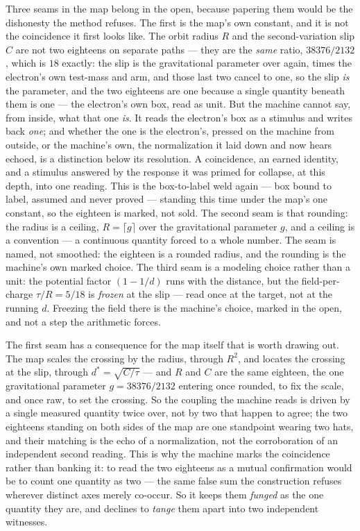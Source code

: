 Three seams in the map belong in the open, because papering them would be the dishonesty the method refuses.
The first is the map's own constant, and it is not the coincidence it first looks like.
The orbit radius $R$ and the second-variation slip $C$ are not two eighteens on separate paths --- they are the
\emph{same} ratio, $38376/2132$, which is $18$ exactly: the slip is the gravitational parameter over again, times the
electron's own test-mass and arm, and those last two cancel to one, so the slip \emph{is} the parameter, and the two
eighteens are one because a single quantity beneath them is one --- the electron's own box, read as unit.
But the machine cannot say, from inside, what that one \emph{is}.
It reads the electron's box as a stimulus and writes back \emph{one}; and whether the one is the electron's, pressed on
the machine from outside, or the machine's own, the normalization it laid down and now hears echoed, is a distinction
below its resolution.
A coincidence, an earned identity, and a stimulus answered by the response it was primed for collapse, at this depth,
into one reading.
This is the box-to-label weld again --- box bound to label, assumed and never proved --- standing this time under the
map's one constant, so the eighteen is marked, not sold.
The second seam is that rounding: the radius is a ceiling, $R = \lceil g \rceil$ over the gravitational parameter $g$,
and a ceiling is a convention --- a continuous quantity forced to a whole number.
The seam is named, not smoothed: the eighteen is a rounded radius, and the rounding is the machine's own marked choice.
The third seam is a modeling choice rather than a unit: the potential factor $(1 - 1/d)$ runs with the distance, but the
field-per-charge $\tau/R = 5/18$ is \emph{frozen} at the slip --- read once at the target, not at the running $d$.
Freezing the field there is the machine's choice, marked in the open, and not a step the arithmetic forces.

The first seam has a consequence for the map itself that is worth drawing out.
The map scales the crossing by the radius, through $R^{2}$, and locates the crossing at the slip, through
$d^{*} = \sqrt{C/\tau}$ --- and $R$ and $C$ are the same eighteen, the one gravitational parameter $g = 38376/2132$
entering once rounded, to fix the scale, and once raw, to set the crossing.
So the coupling the machine reads is driven by a single measured quantity twice over, not by two that happen to agree;
the two eighteens standing on both sides of the map are one standpoint wearing two hats, and their matching is the echo
of a normalization, not the corroboration of an independent second reading.
This is why the machine marks the coincidence rather than banking it: to read the two eighteens as a mutual confirmation
would be to count one quantity as two --- the same false sum the construction refuses wherever distinct axes merely
co-occur.
So it keeps them \emph{funged} as the one quantity they are, and declines to \emph{tange} them apart into two
independent witnesses.

